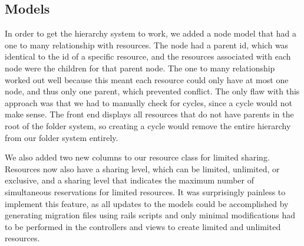 \documentclass{article}
\begin{document}
\subsection{Models}
In order to get the hierarchy system to work, we added a node model that had a one to many relationship with resources. The node had a parent id, which was identical to the id of a specific resource, and the resources associated with each node were the children for that parent node. The one to many relationship worked out well because this meant each resource could only have at most one node, and thus only one parent, which prevented conflict. The only flaw with this approach was that we had to manually check for cycles, since a cycle would not make sense.  The front end displays all resources that do not have parents in the root of the folder system, so creating a cycle would remove the entire hierarchy from our folder system entirely.\par
We also added two new columns to our resource class for limited sharing.  Resources now also have a sharing level, which can be limited, unlimited, or exclusive, and a sharing level that indicates the maximum number of simultaneous reservations for limited resources.  It was surprisingly painless to implement this feature, as all updates to the models could be accomplished by generating migration files using rails scripts and only minimal modifications had to be performed in the controllers and views to create limited and unlimited resources.
\end{document}
